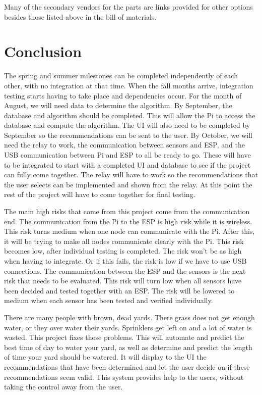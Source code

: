 \documentclass[letterpaper, 10 pt, conference]{ieeeconf}  %
\begin{document}
Many of the secondary vendors for the parts are links provided for other options besides those listed above in the bill of materials.
\section{Conclusion}
The spring and summer milestones can be completed independently of each other, with no integration at that time. When the fall months arrive, integration testing starts having to take place and dependencies occur. For the month of August, we will need data to determine the algorithm. By September, the database and algorithm should be completed. This will allow the Pi to access the database and compute the algorithm. The UI will also need to be completed by September so the recommendations can be sent to the user. By October, we will need the relay to work, the communication between sensors and ESP, and the USB communication between Pi and ESP to all be ready to go. These will have to be integrated to start with a completed UI and database to see if the project can fully come together. The relay will have to work so the recommendations that the user selects can be implemented and shown from the relay. At this point the rest of the project will have to come together for final testing. 

The main high risks that come from this project come from the communication end. The communication from the Pi to the ESP is high risk while it is wireless. This risk turns medium when one node can communicate with the Pi. After this, it will be trying to make all nodes communicate clearly with the Pi. This risk becomes low, after individual testing is completed. The risk won't be as high when having to integrate. Or if this fails, the risk is low if we have to use USB connections. The communication between the ESP and the sensors is the next risk that needs to be evaluated. This risk will turn low when all sensors have been decided and tested together with an ESP. The risk will be lowered to medium when each sensor has been tested and verified individually. 

There are many people with brown, dead yards. There grass does not get enough water, or they over water their yards. Sprinklers get left on and a lot of water is wasted. This project fixes those problems. This will automate and predict the best time of day to water your yard, as well as determine and predict the length of time your yard should be watered. It will display to the UI the recommendations that have been determined and let the user decide on if these recommendations seem valid. This system provides help to the users, without taking the control away from the user. 





\end{document}

